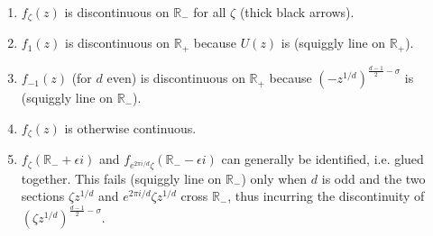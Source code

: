 \documentclass[12pt]{article}
\newcommand{\ee}[0] {e}
\newcommand{\ii}[0] {i}
\numberwithin{equation}{section}
\begin{document}
\begin{enumerate}
\item{$f_{\zeta}(z)$ is discontinuous on $\mathbb{R}_{-}$ for all $\zeta$ (thick black arrows).}
\item{$f_1(z)$ is discontinuous on $\mathbb{R}_{+}$ because $U(z)$ is (squiggly line on $\mathbb{R}_{+}$).}
\item{$f_{-1}(z)$ (for $d$ even) is discontinuous on $\mathbb{R}_{+}$ because $(-z^{1/d})^{\frac{d-1}{2}-\sigma}$} is (squiggly line on $\mathbb{R}_{-}$).
\item{$f_{\zeta}(z)$ is otherwise continuous.}
\item{$f_{\zeta}(\mathbb{R}_{-} + \epsilon \ii)$ and $f_{\ee^{2\pi \ii/d}\zeta}(\mathbb{R}_{-} - \epsilon \ii)$ can generally be identified, i.e. glued together. This fails (squiggly line on $\mathbb{R}_{-}$) only when $d$ is odd and the two sections $\zeta z^{1/d}$ and $\ee^{2\pi \ii/d}\zeta z^{1/d}$ cross $\mathbb{R}_{-}$, thus incurring the discontinuity of $(\zeta z^{1/d})^{\frac{d-1}{2}-\sigma}$.}
\end{enumerate}
\end{document}
